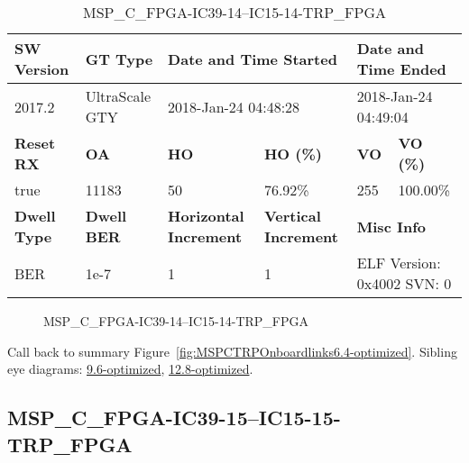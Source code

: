 \begin{table}[h]
\centering
\caption{MSP\_C\_FPGA-IC39-14--IC15-14-TRP\_FPGA}
\label{tab:MSPCFPGAIC3914IC1514TRPFPGA6.4-optimized}
\begin{tabular}{@{}|l|l|l|l|l|l|@{}}
\toprule
\textbf{SW Version}                & \textbf{GT Type}   & \multicolumn{2}{l|}{\textbf{Date and Time Started}}            & \multicolumn{2}{l|}{\textbf{Date and Time Ended}}        \\ \midrule
2017.2                       & UltraScale GTY          & \multicolumn{2}{l|}{2018-Jan-24 04:48:28}                   & \multicolumn{2}{l|}{2018-Jan-24 04:49:04}               \\ \midrule
\textbf{Reset RX}                  & \textbf{OA} & \textbf{HO}   & \textbf{HO (\%)} & \textbf{VO} & \textbf{VO (\%)} \\ \midrule
true & 11183        & 50          & 76.92\%        & 255        & 100.00\%       \\ \midrule
\textbf{Dwell Type}                & \textbf{Dwell BER} & \textbf{Horizontal Increment} & \textbf{Vertical Increment}    & \multicolumn{2}{l|}{\textbf{Misc Info}}                  \\ \midrule
BER                            & 1e-7        & 1        & 1           & \multicolumn{2}{l|}{ELF Version: 0x4002 SVN: 0}                         \\ \bottomrule
\end{tabular}
\end{table}

\begin{figure}[h]
\caption{MSP\_C\_FPGA-IC39-14--IC15-14-TRP\_FPGA} \label{fig:MSPCFPGAIC3914IC1514TRPFPGA6.4-optimized}
\end{figure}

Call back to summary Figure~\ref{fig:MSPCTRPOnboardlinks6.4-optimized}.
Sibling eye diagrams: \hyperref[sec:MSPCFPGAIC3914IC1514TRPFPGA9.6-optimized]{9.6-optimized}, \hyperref[sec:MSPCFPGAIC3914IC1514TRPFPGA12.8-optimized]{12.8-optimized}.

\clearpage
\newpage


\subsection{MSP\_C\_FPGA-IC39-15--IC15-15-TRP\_FPGA}\label{sec:MSPCFPGAIC3915IC1515TRPFPGA6.4-optimized}

